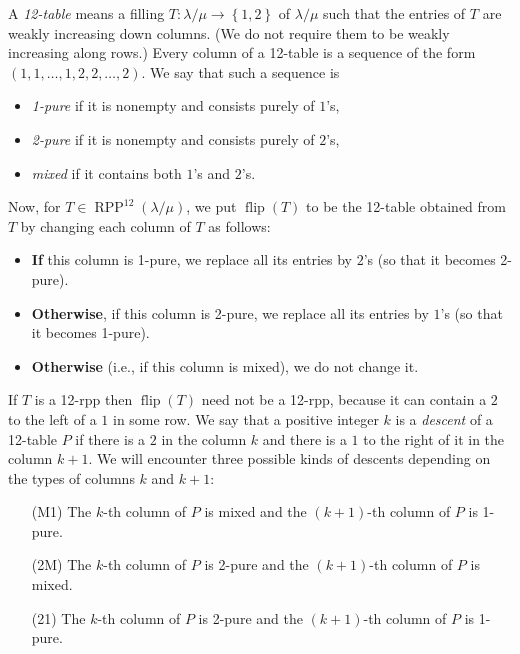 \documentclass[numbers=enddot,12pt,final,onecolumn,notitlepage]{scrartcl}%
\theoremstyle{definition}
\def\lm{{\lambda/\mu}}
\def\OneTwoRPP{{\operatorname*{RPP}^{12}\left(  \lambda/\mu\right)}}
\def\flip{{\operatorname*{flip}}}
\begin{document}
A \textit{12-table} means a filling $T:\lm\rightarrow\left\{  1,2\right\}  $
of $\lm$
such that the entries of $T$ are weakly increasing down columns. (We do not
require them to be weakly increasing along rows.) Every column of a 12-table
is a sequence of the form $(1,1,\ldots,1,2,2,\ldots,2)$. We say that such a sequence is

\begin{itemize}
\item \textit{1-pure} if it is nonempty and consists purely of $1$'s,

\item \textit{2-pure} if it is nonempty and consists purely of $2$'s,

\item \textit{mixed} if it contains both $1$'s and $2$'s.
\end{itemize}

\def\flip{{\operatorname*{flip}}}

Now, for $T\in\OneTwoRPP$, we put $\flip(T)$ to be the 12-table obtained from $T$ by changing each column of $T$ as follows:

\begin{itemize}
\item \textbf{If} this column is 1-pure, we replace all its entries by $2$'s
(so that it becomes 2-pure).

\item \textbf{Otherwise}, if this column is 2-pure, we replace all its entries by
$1$'s (so that it becomes 1-pure).

\item \textbf{Otherwise} (i.e., if this column is mixed), we do not change it.
\end{itemize}

If $T$ is a 12-rpp then $\flip(T)$ need not be a 12-rpp, because it can contain a $2$ to the left of a $1$ in some row. We say that a positive integer $k$ is a \textit{descent} of a 12-table $P$ if there is a $2$ in the column $k$ and there is a $1$ to the right of it in the column $k+1$. We will encounter three possible kinds of descents depending on the types of columns $k$ and $k+1$:

\begin{itemize}
\item[(M1)] The $k$-th column of $P$ is mixed and the $\left(  k+1\right)  $-th column of $P$ is 1-pure.

\item[(2M)] The $k$-th column of $P$ is 2-pure and the $\left(  k+1\right)  $-th column of $P$ is mixed.

\item[(21)] The $k$-th column of $P$ is 2-pure and the $\left(  k+1\right)  $-th column of $P$ is 1-pure.
\end{itemize}
\end{document}
